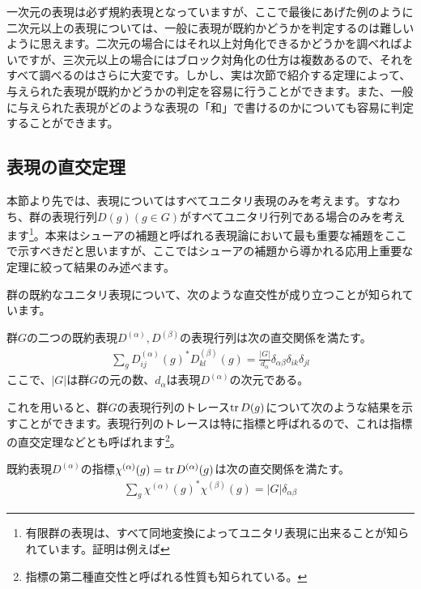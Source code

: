 \documentclass[uplatex,dvipdfmx,a4j,openany]{jsarticle}
\begin{document}
一次元の表現は必ず規約表現となっていますが、ここで最後にあげた例のように二次元以上の表現については、一般に表現が既約かどうかを判定するのは難しいように思えます。二次元の場合にはそれ以上対角化できるかどうかを調べればよいですが、三次元以上の場合にはブロック対角化の仕方は複数あるので、それをすべて調べるのはさらに大変です。しかし、実は次節で紹介する定理によって、与えられた表現が既約かどうかの判定を容易に行うことができます。また、一般に与えられた表現がどのような表現の「和」で書けるのかについても容易に判定することができます。

\subsection{表現の直交定理}
本節より先では、表現についてはすべてユニタリ表現のみを考えます。すなわち、群の表現行列$D(g) (g\in G)$がすべてユニタリ行列である場合のみを考えます\footnote{有限群の表現は、すべて同地変換によってユニタリ表現に出来ることが知られています。証明は例えば\cite{ouyougunron}}。本来はシューアの補題と呼ばれる表現論において最も重要な補題をここで示すべきだと思いますが、ここではシューアの補題から導かれる応用上重要な定理に絞って結果のみ述べます。

	

群の既約なユニタリ表現について、次のような直交性が成り立つことが知られています。
\begin{tcolorbox}[title=定理：表現行列の直交性]
	群$G$の二つの既約表現$D^{(\alpha)}, D^{(\beta)}$の表現行列は次の直交関係を満たす。
	\begin{align}
		\sum_g D^{(\alpha)}_{ij}(g)^* D^{(\beta)}_{kl}(g) = \frac{|G|}{d_\alpha} \delta_{\alpha\beta}\delta_{ik}\delta_{jl}
	\end{align}
	ここで、$|G|$は群$G$の元の数、$d_\alpha$は表現$D^{(\alpha)}$の次元である。
\end{tcolorbox}

これを用いると、群$G$の表現行列のトレース$\tr D(g)$について次のような結果を示すことができます。表現行列のトレースは特に指標と呼ばれるので、これは指標の直交定理などとも呼ばれます\footnote{指標の第二種直交性と呼ばれる性質も知られている。}。

\begin{tcolorbox}[title=指標の第一種直交性]
	既約表現$D^{(\alpha)}$の指標$\chi^{(\alpha)}(g) = \tr D^{(\alpha)}(g)$は次の直交関係を満たす。
	\begin{align}
		\sum_g \chi^{(\alpha)}(g)^* \chi^{(\beta)}(g) = |G|\delta_{\alpha\beta} \label{eq:character_orthogonality}
	\end{align}
\end{tcolorbox}
\end{document}
